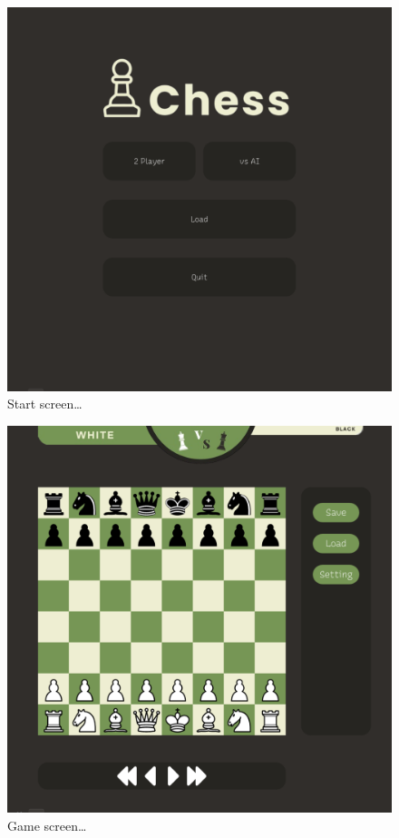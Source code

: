 \documentclass[a4paper, 10pt, titlepage]{report}
\begin{document}
  \begin{figure}%
    \includegraphics[width=\linewidth]{start_screen.png}
    \caption{Start screen\dots}
    \label{fig:first}
  \end{figure}%
  \hfill

  \begin{figure}%
    \includegraphics[width=\linewidth]{game_screen.png}
    \caption{Game screen\dots}
    \label{fig:second}
  \end{figure}%
  \hfill \break
  
\end{document}
